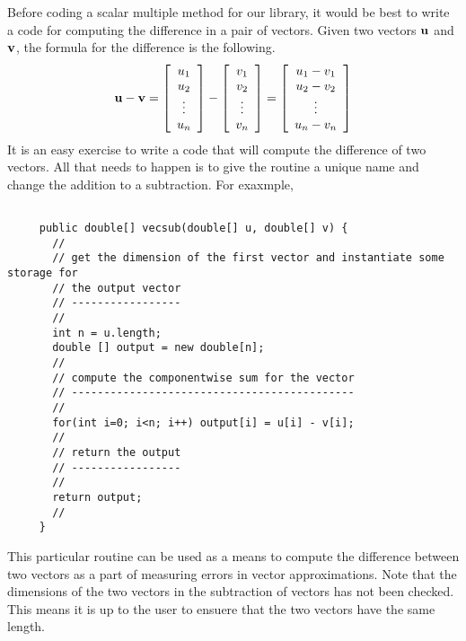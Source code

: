 \documentclass[10pt,fleqn]{article}
\begin{document}
Before coding a scalar multiple method for our library, it would be best to
write a code for computing the difference in a pair of vectors. Given two
vectors ${\bf u}$ and ${\bf v}$, the formula for the difference is the
following.
$$
  {\bf u} - {\bf v} = 
       \left[
         \begin{array}{c}
           u_1 \\
           u_2 \\
           \vdots \\
           u_n
         \end{array}
       \right]
     - \left[
         \begin{array}{c}
           v_1 \\
           v_2 \\
           \vdots \\
           v_n
         \end{array}
       \right]
     = \left[
         \begin{array}{c}
           u_1 - v_1 \\
           u_2 - v_2 \\
           \vdots \\
           u_n - v_n
         \end{array}
       \right]
$$
It is an easy exercise to write a code that will compute the difference of two
vectors. All that needs to happen is to give the routine a unique name and
change the addition to a subtraction. For exaxmple,
\begin{verbatim}

     public double[] vecsub(double[] u, double[] v) {
       //
       // get the dimension of the first vector and instantiate some storage for
       // the output vector
       // -----------------
       //
       int n = u.length;
       double [] output = new double[n];
       //
       // compute the componentwise sum for the vector
       // --------------------------------------------
       //
       for(int i=0; i<n; i++) output[i] = u[i] - v[i];
       //
       // return the output
       // -----------------
       //
       return output;
       //
     }

\end{verbatim}
This particular routine can be used as a means to compute the difference between
two vectors as a part of measuring errors in vector approximations. Note that
the dimensions of the two vectors in the subtraction of vectors has not been
checked. This means it is up to the user to ensuere that the two vectors have
the same length.
\end{document}
